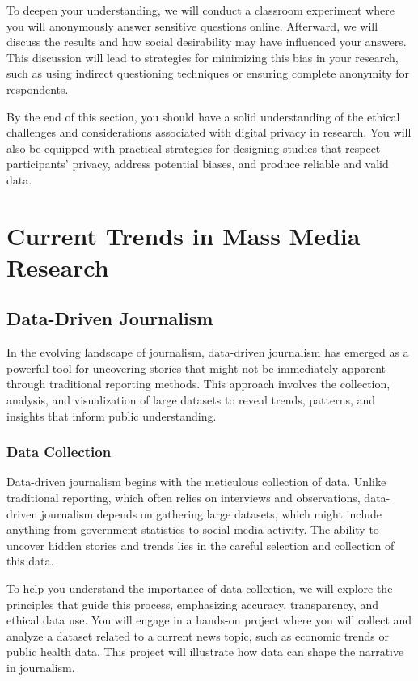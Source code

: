 \documentclass[
]{book}
\begin{document}
To deepen your understanding, we will conduct a classroom experiment where you will anonymously answer sensitive questions online. Afterward, we will discuss the results and how social desirability may have influenced your answers. This discussion will lead to strategies for minimizing this bias in your research, such as using indirect questioning techniques or ensuring complete anonymity for respondents.

By the end of this section, you should have a solid understanding of the ethical challenges and considerations associated with digital privacy in research. You will also be equipped with practical strategies for designing studies that respect participants' privacy, address potential biases, and produce reliable and valid data.

\section{Current Trends in Mass Media Research}\label{current-trends-in-mass-media-research}

\subsection{Data-Driven Journalism}\label{data-driven-journalism}

In the evolving landscape of journalism, data-driven journalism has emerged as a powerful tool for uncovering stories that might not be immediately apparent through traditional reporting methods. This approach involves the collection, analysis, and visualization of large datasets to reveal trends, patterns, and insights that inform public understanding.

\subsubsection{Data Collection}\label{data-collection}

Data-driven journalism begins with the meticulous collection of data. Unlike traditional reporting, which often relies on interviews and observations, data-driven journalism depends on gathering large datasets, which might include anything from government statistics to social media activity. The ability to uncover hidden stories and trends lies in the careful selection and collection of this data.

To help you understand the importance of data collection, we will explore the principles that guide this process, emphasizing accuracy, transparency, and ethical data use. You will engage in a hands-on project where you will collect and analyze a dataset related to a current news topic, such as economic trends or public health data. This project will illustrate how data can shape the narrative in journalism.
\end{document}
